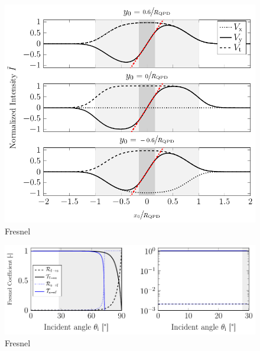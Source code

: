 \lipsum[1-5]

\begin{figure}[htp]
  \centering
  \includegraphics[]{Plots/cache/voltages_over_x.pdf}
  \caption{Fresnel}
  \label{fig:T_voltages_over_x}
\end{figure}

\lipsum[1-5]

\begin{figure}[htp]
  \centering
  \includegraphics[]{Plots/cache/Fresnel.pdf}
  \caption{Fresnel}
  \label{fig:T_fresnel}
\end{figure}

\lipsum[1-5]

